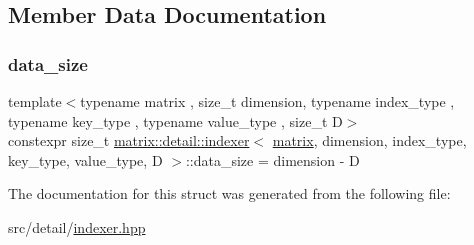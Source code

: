 \subsection{Member Data Documentation}
\mbox{\label{structmatrix_1_1detail_1_1indexer_ad253e4bd5e3639bcf8fdf64a94e796b1}} 
\subsubsection{\texorpdfstring{data\+\_\+size}{data\_size}}
{\footnotesize\ttfamily template$<$typename matrix , size\+\_\+t dimension, typename index\+\_\+type , typename key\+\_\+type , typename value\+\_\+type , size\+\_\+t D$>$ \\
constexpr size\+\_\+t \hyperlink{structmatrix_1_1detail_1_1indexer}{matrix\+::detail\+::indexer}$<$ \hyperlink{structmatrix_1_1matrix}{matrix}, dimension, index\+\_\+type, key\+\_\+type, value\+\_\+type, D $>$\+::data\+\_\+size = dimension -\/ D\hspace{0.3cm}{\ttfamily [static]}}



The documentation for this struct was generated from the following file\+:\begin{DoxyCompactItemize}
\item 
src/detail/\hyperlink{indexer_8hpp}{indexer.\+hpp}\end{DoxyCompactItemize}
